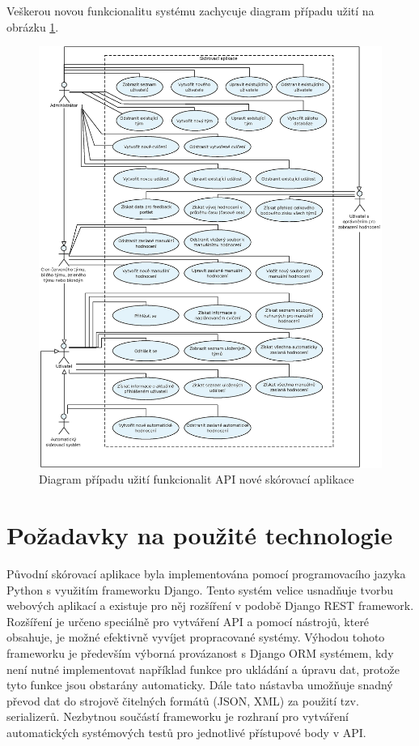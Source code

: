 \documentclass[
  digital,
  twoside,
  table, 
  nolof, 
  nolot
]{fithesis3}
\begin{document}
Veškerou novou funkcionalitu systému zachycuje diagram případu užití na obrázku \ref{fig:useCase2}.

\begin{figure}
    \centering
    \includegraphics[width=15cm]{images/Use-case-2.eps}
    \caption{Diagram případu užití funkcionalit API nové skórovací aplikace}
    \label{fig:useCase2}
\end{figure}

\section{Požadavky na použité technologie}

Původní skórovací aplikace byla implementována pomocí programovacího jazyka Python s využitím frameworku Django. Tento systém velice usnadňuje tvorbu webových aplikací a existuje pro něj rozšíření v podobě Django REST framework. Rozšíření je určeno speciálně pro vytváření API a pomocí nástrojů, které obsahuje, je možné efektivně vyvíjet propracované systémy. Výhodou tohoto frameworku je především výborná provázanost s Django ORM systémem, kdy není nutné implementovat například funkce pro ukládání a úpravu dat, protože tyto funkce jsou obstarány automaticky. Dále tato nástavba umožňuje snadný převod dat do strojově čitelných formátů (JSON, XML) za použití tzv. serializerů. Nezbytnou součástí frameworku je rozhraní pro vytváření automatických systémových testů pro jednotlivé přístupové body v API.
\end{document}
